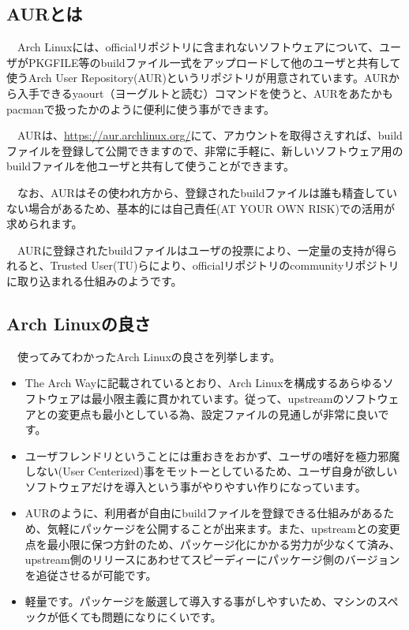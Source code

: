\documentclass[mingoth,a4paper]{jsarticle}
\begin{document}
\subsection{AURとは}

　Arch Linuxには、officialリポジトリに含まれないソフトウェアについて、ユーザがPKGFILE等のbuildファイル一式をアップロードして他のユーザと共有して使うArch User Repository(AUR)というリポジトリが用意されています。AURから入手できるyaourt（ヨーグルトと読む）コマンドを使うと、AURをあたかもpacmanで扱ったかのように便利に使う事ができます。

　AURは、\url{https://aur.archlinux.org/}にて、アカウントを取得さえすれば、buildファイルを登録して公開できますので、非常に手軽に、新しいソフトウェア用のbuildファイルを他ユーザと共有して使うことができます。

　なお、AURはその使われ方から、登録されたbuildファイルは誰も精査していない場合があるため、基本的には自己責任(AT YOUR OWN RISK)での活用が求められます。

　AURに登録されたbuildファイルはユーザの投票により、一定量の支持が得られると、Trusted User(TU)らにより、officialリポジトリのcommunityリポジトリに取り込まれる仕組みのようです。

\subsection{Arch Linuxの良さ}

　使ってみてわかったArch Linuxの良さを列挙します。

\begin{itemize}
\item The Arch Wayに記載されているとおり、Arch Linuxを構成するあらゆるソフトウェアは最小限主義に貫かれています。従って、upstreamのソフトウェアとの変更点も最小としている為、設定ファイルの見通しが非常に良いです。
\item ユーザフレンドリということには重おきをおかず、ユーザの嗜好を極力邪魔しない(User Centerized)事をモットーとしているため、ユーザ自身が欲しいソフトウェアだけを導入という事がやりやすい作りになっています。
\item AURのように、利用者が自由にbuildファイルを登録できる仕組みがあるため、気軽にパッケージを公開することが出来ます。また、upstreamとの変更点を最小限に保つ方針のため、パッケージ化にかかる労力が少なくて済み、upstream側のリリースにあわせてスピーディーにパッケージ側のバージョンを追従させるが可能です。
\item 軽量です。パッケージを厳選して導入する事がしやすいため、マシンのスペックが低くても問題になりにくいです。
\end{itemize}
\end{document}
